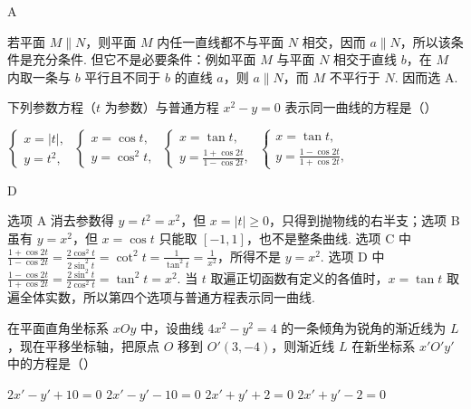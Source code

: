 \documentclass[UTF8,a4paper,oneside,11pt]{ctexbook}
\begin{document}
\begin{answer}
A
\end{answer}

\begin{solution}
若平面 \(M\parallel N\)，则平面 \(M\) 内任一直线都不与平面 \(N\) 相交，因而 \(a\parallel N\)，所以该条件是充分条件. 但它不是必要条件：例如平面 \(M\) 与平面 \(N\) 相交于直线 \(b\)，在 \(M\) 内取一条与 \(b\) 平行且不同于 \(b\) 的直线 \(a\)，则 \(a\parallel N\)，而 \(M\) 不平行于 \(N\). 因而选 A.
\end{solution}

\begin{problem}
下列参数方程（\(t\) 为参数）与普通方程 \(x^2 - y = 0\) 表示同一曲线的方程是（\quad）

\choices
    {\(\begin{cases}
x = |t|,\\
y = t^2,
\end{cases}\)}
    {\(\begin{cases}
x = \cos t,\\
y = \cos^2 t,
\end{cases}\)}
    {\(\begin{cases}
x = \tan t,\\
y = \frac{1 + \cos 2t}{1 - \cos 2t},
\end{cases}\)}
    {\(\begin{cases}
x = \tan t,\\
y = \frac{1 - \cos 2t}{1 + \cos 2t},
\end{cases}\)}
\end{problem}

\begin{answer}
D
\end{answer}

\begin{solution}
选项 A 消去参数得 \(y=t^2=x^2\)，但 \(x=|t|\geqslant0\)，只得到抛物线的右半支；选项 B 虽有 \(y=x^2\)，但 \(x=\cos t\) 只能取 \([-1,1]\)，也不是整条曲线. 选项 C 中
\(\frac{1+\cos2t}{1-\cos2t}=\frac{2\cos^2t}{2\sin^2t}=\cot^2t=\frac1{\tan^2t}=\frac1{x^2}\)，所得不是 \(y=x^2\). 选项 D 中
\(\frac{1-\cos2t}{1+\cos2t}=\frac{2\sin^2t}{2\cos^2t}=\tan^2t=x^2\). 当 \(t\) 取遍正切函数有定义的各值时，\(x=\tan t\) 取遍全体实数，所以第四个选项与普通方程表示同一曲线.
\end{solution}

\begin{problem}
在平面直角坐标系 \(xOy\) 中，设曲线 \(4x^2 - y^2 = 4\) 的一条倾角为锐角的渐近线为 \(L\)，现在平移坐标轴，把原点 \(O\) 移到 \(O'(3,-4)\)，则渐近线 \(L\) 在新坐标系 \(x'O'y'\) 中的方程是（\quad）

\choices
    {\(2x' - y' + 10 = 0\)}
    {\(2x' - y' - 10 = 0\)}
    {\(2x' + y' + 2 = 0\)}
    {\(2x' + y' - 2 = 0\)}
\end{problem}
\end{document}
